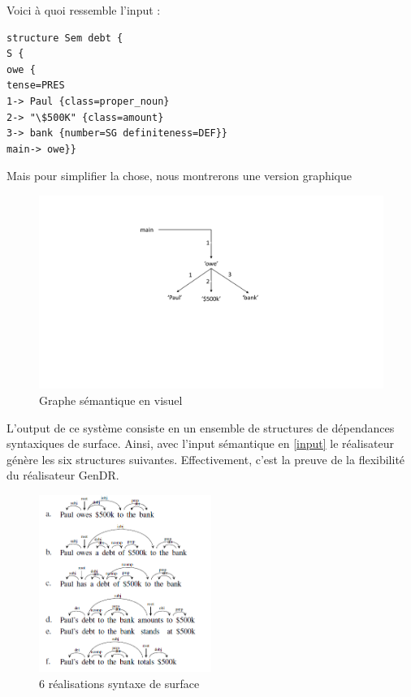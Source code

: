 Voici à quoi ressemble l'input :
\begin{lstlisting}[language=XML, caption = Input sémantique, label=input]
structure Sem debt {
S {
owe {
tense=PRES
1-> Paul {class=proper_noun}
2-> "\$500K" {class=amount}
3-> bank {number=SG definiteness=DEF}}
main-> owe}}
\end{lstlisting}

Mais pour simplifier la chose, nous montrerons une version graphique
\begin{figure}[htb]
	\centering
	\includegraphics[width=1\textwidth, trim = {0cm 4cm 0cm 3cm},clip]{ch3/figs/owe_sem.pdf}
	\caption{Graphe sémantique en visuel}
	\label{fig:graphesem}
\end{figure}

L'output de ce système consiste en un ensemble de structures de dépendances syntaxiques de surface. Ainsi, avec l'input sémantique en \ref{input} le réalisateur génère les six structures suivantes. Effectivement, c'est la preuve de la flexibilité du réalisateur GenDR. 

\begin{figure}[htb]
	\centering
	\includegraphics[width=0.5\textwidth, trim = {0cm 0cm 0cm 0cm},clip]{ch3/figs/exemples_real.png}
	\caption{6 réalisations syntaxe de surface}
	\label{fig:realsurf}
\end{figure}

